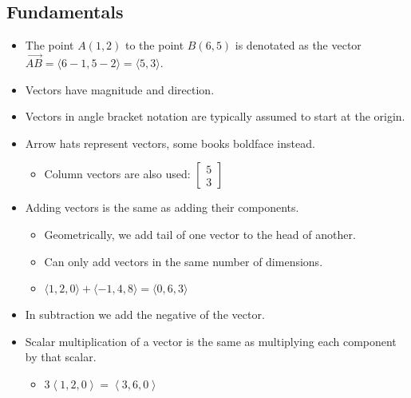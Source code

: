 \documentclass[12pt]{article}
\theoremstyle{plain} %
\theoremstyle{definition}
\theoremstyle{definition}
\theoremstyle{definition}
\theoremstyle{remark}
\newcommand{\angled}[1]{\left\langle {#1} \right\rangle}
\begin{document}
\subsection{Fundamentals}
\begin{itemize}
    \item The point $A(1,2)$ to the point $B(6,5)$ is denotated as the vector $\overrightarrow{AB} = \langle 6-1,5-2 \rangle = \langle 5,3 \rangle$.
    \item Vectors have magnitude and direction.
    \item Vectors in angle bracket notation are typically assumed to start at the origin.
    \item Arrow hats represent vectors, some books boldface instead.
    \begin{itemize}
        \item Column vectors are also used: $\begin{bmatrix} 5 \\ 3 \end{bmatrix}$
    \end{itemize}
    \item Adding vectors is the same as adding their components.
    \begin{itemize}
        \item Geometrically, we add tail of one vector to the head of another.
        \item Can only add vectors in the same number of dimensions.
        \item $\langle 1,2,0 \rangle + \langle -1,4,8 \rangle = \langle 0,6,3 \rangle$
    \end{itemize}
    \item In subtraction we add the negative of the vector.
    \item Scalar multiplication of a vector is the same as multiplying each component by that scalar.
    \begin{itemize}
        \item $3\angled{1,2,0} = \angled{3,6,0}$
    \end{itemize}
\end{itemize}
\end{document}
